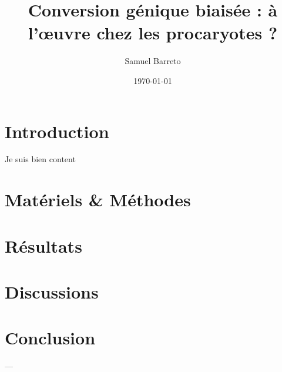 \documentclass[11pt, oneside]{scrartcl}
\author{Samuel Barreto}
\date{\today}
\title{Conversion génique biaisée : à l'œuvre chez les procaryotes ?}
\begin{document}


\section*{Introduction}
\label{sec:orgheadline1}
Je suis bien content

\section{Matériels \& Méthodes}
\label{sec:orgheadline2}
\section{Résultats}
\label{sec:orgheadline3}
\section{Discussions}
\label{sec:orgheadline4}
\section*{Conclusion}
\label{sec:orgheadline5}
---


\end{document}
